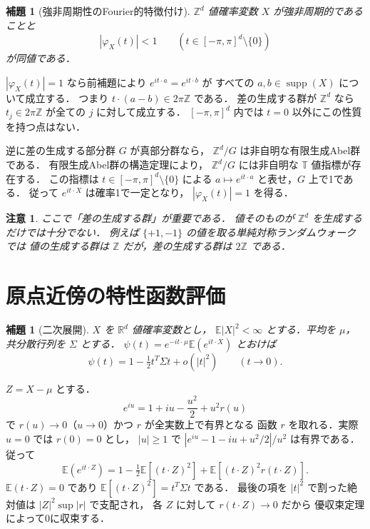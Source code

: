 \documentclass[a5paper,10pt,onecolumn]{jsarticle}
\makeatletter
\theoremstyle{mathnotetheorem}
\newtheorem{lemma}[theorem]{補題}
\newtheorem{remark}[theorem]{注意}
\renewcommand{\proofname}{証明}
\renewenvironment{proof}[1][\proofname]{%
  \par\pushQED{\qed}\normalfont\topsep4\p@\@plus2\p@\relax
  \trivlist\item[\hskip\labelsep\bfseries #1]\ignorespaces
}{\popQED\endtrivlist\@endpefalse}
\makeatother
\begin{document}
\begin{lemma}[強非周期性のFourier的特徴付け]\label{lem:period}
$\mathbb Z^d$ 値確率変数 $X$ が強非周期的であることと
\[
 |\varphi_X(t)|<1\qquad
  (t\in[-\pi,\pi]^d\setminus\{0\})
\]
が同値である．
\end{lemma}
\begin{proof}
$|\varphi_X(t)|=1$ なら前補題により
$e^{it\cdot a}=e^{it\cdot b}$ が
すべての $a,b\in\operatorname{supp}(X)$ について成立する．
つまり $t\cdot(a-b)\in2\pi\mathbb Z$ である．
差の生成する群が $\mathbb Z^d$ なら
$t_j\in2\pi\mathbb Z$ が全ての $j$ に対して成立する．
$[-\pi,\pi]^d$ 内では $t=0$ 以外にこの性質を持つ点はない．

逆に差の生成する部分群 $G$ が真部分群なら，
$\mathbb Z^d/G$ は非自明な有限生成Abel群である．
有限生成Abel群の構造定理により，
$\mathbb Z^d/G$ には非自明な $\mathbb T$ 値指標が存在する．
この指標は $t\in[-\pi,\pi]^d\setminus\{0\}$ による
$a\mapsto e^{it\cdot a}$ と表せ，$G$ 上で1である．
従って $e^{it\cdot X}$ は確率1で一定となり，
$|\varphi_X(t)|=1$ を得る．
\end{proof}

\begin{remark}
ここで「差の生成する群」が重要である．
値そのものが $\mathbb Z^d$ を生成するだけでは十分でない．
例えば $\{+1,-1\}$ の値を取る単純対称ランダムウォークでは
値の生成する群は $\mathbb Z$ だが，差の生成する群は
$2\mathbb Z$ である．
\end{remark}

\section{原点近傍の特性函数評価}
\begin{lemma}[二次展開]\label{lem:tay}
$X$ を $\mathbb R^d$ 値確率変数とし，
$\mathbb E|X|^2<\infty$ とする．平均を $\mu$，
共分散行列を $\Sigma$ とする．
$\psi(t)=e^{-it\cdot\mu}\mathbb E(e^{it\cdot X})$
とおけば
\[
 \psi(t)=1-\tfrac12t^T\Sigma t+o(|t|^2)
 \qquad(t\longrightarrow0).
\]
\end{lemma}
\begin{proof}
$Z=X-\mu$ とする．
\[
 e^{iu}=1+iu-\frac{u^2}{2}+u^2r(u)
\]
で $r(u)\to0$（$u\to0$）かつ $r$ が全実数上で有界となる
函数 $r$ を取れる．実際 $u=0$ では $r(0)=0$ とし，
$|u|\ge1$ で $|e^{iu}-1-iu+u^2/2|/u^2$ は有界である．
従って
\[
 \mathbb E(e^{it\cdot Z})
 =1-\tfrac12\mathbb E[(t\cdot Z)^2]
  +\mathbb E[(t\cdot Z)^2r(t\cdot Z)].
\]
$\mathbb E(t\cdot Z)=0$ であり
$\mathbb E[(t\cdot Z)^2]=t^T\Sigma t$ である．
最後の項を $|t|^2$ で割った絶対値は
$|Z|^2\sup|r|$ で支配され，
各 $Z$ に対して $r(t\cdot Z)\to0$ だから
優収束定理によって0に収束する．
\end{proof}
\end{document}
